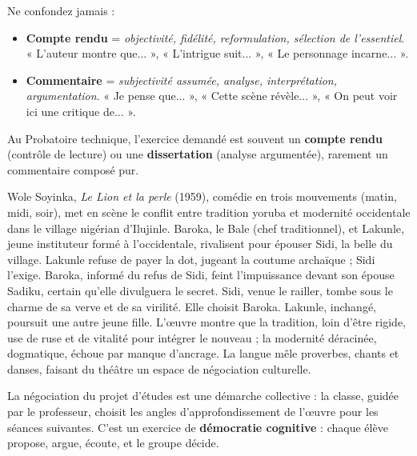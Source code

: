 \documentclass[11pt]{article}
\newcommand{\cle}[1]{{\popxbold\color{popdark}#1}}
\newcounter{popsec}
\newcounter{popsub}
\newcommand{\courssub}[1]{%
  \stepcounter{popsub}%
  \par\vspace{9pt}\noindent{\popxbold\fontsize{11.5}{13}\selectfont\color{popink}{\color{poporange}\thepopsec.\thepopsub}\hspace{6pt}#1}\par\nopagebreak\vspace{4pt}
}
\begin{document}
\begin{attention}
Ne confondez jamais :
\begin{itemize}
    \item \textbf{Compte rendu} = \emph{objectivité, fidélité, reformulation, sélection de l'essentiel}. « L'auteur montre que... », « L'intrigue suit... », « Le personnage incarne... ».
    \item \textbf{Commentaire} = \emph{subjectivité assumée, analyse, interprétation, argumentation}. « Je pense que... », « Cette scène révèle... », « On peut voir ici une critique de... ».
\end{itemize}
Au Probatoire technique, l'exercice demandé est souvent un \textbf{compte rendu} (contrôle de lecture) ou une \textbf{dissertation} (analyse argumentée), rarement un commentaire composé pur.
\end{attention}

\begin{exemplebox}
Wole Soyinka, \emph{Le Lion et la perle} (1959), comédie en trois mouvements (matin, midi, soir), met en scène le conflit entre tradition yoruba et modernité occidentale dans le village nigérian d'Ilujinle. Baroka, le Bale (chef traditionnel), et Lakunle, jeune instituteur formé à l'occidentale, rivalisent pour épouser Sidi, la belle du village. Lakunle refuse de payer la dot, jugeant la coutume archaïque ; Sidi l'exige. Baroka, informé du refus de Sidi, feint l'impuissance devant son épouse Sadiku, certain qu'elle divulguera le secret. Sidi, venue le railler, tombe sous le charme de sa verve et de sa virilité. Elle choisit Baroka. Lakunle, inchangé, poursuit une autre jeune fille. L'œuvre montre que la tradition, loin d'être rigide, use de ruse et de vitalité pour intégrer le nouveau ; la modernité déracinée, dogmatique, échoue par manque d'ancrage. La langue mêle proverbes, chants et danses, faisant du théâtre un espace de négociation culturelle.
\end{exemplebox}

\courssub{Négociation du projet d'études}

La \cle{négociation du projet d'études} est une démarche collective : la classe, guidée par le professeur, choisit les angles d'approfondissement de l'œuvre pour les séances suivantes. C'est un exercice de \textbf{démocratie cognitive} : chaque élève propose, argue, écoute, et le groupe décide.
\end{document}
